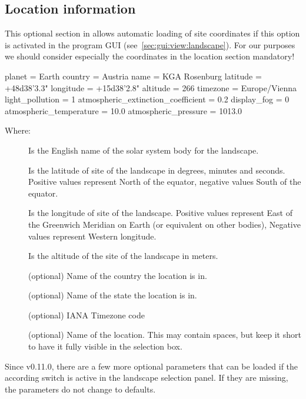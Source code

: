 \subsection{Location information}
\label{sec:landscapes:location}

This optional section in  allows automatic loading
of site coordinates if this option is activated in the program
GUI (see~\ref{sec:gui:view:landscape}). For our purposes we should consider especially the coordinates in
the location section mandatory!

\begin{configfile}
[location]
planet = Earth
country = Austria
name = KGA Rosenburg
latitude = +48d38'3.3"
longitude = +15d38'2.8"
altitude = 266
timezone = Europe/Vienna
light_pollution = 1
atmospheric_extinction_coefficient = 0.2
display_fog = 0
atmospheric_temperature = 10.0
atmospheric_pressure = 1013.0
\end{configfile}
%
Where:
\begin{description}
\item[] Is the English name of the solar system body for
  the landscape.
\item[] Is the latitude of site of the landscape in
  degrees, minutes and seconds. Positive values represent North of the
  equator, negative values South of the equator.
\item[] Is the longitude of site of the
  landscape. Positive values represent East of the Greenwich Meridian
  on Earth (or equivalent on other bodies), Negative values represent
  Western longitude.
\item[] Is the altitude of the site of the landscape in meters.
\item[] (optional) Name of the country the location is in.
\item[] (optional) Name of the state the location is in.
\item[] (optional) IANA Timezone code 
\item[] (optional) Name of the location. This may contain
  spaces, but keep it short to have it fully visible in the
  selection box.
\end{description}
%
Since v0.11.0, there are a few more optional parameters that can be
loaded if the according switch is active in the landscape selection
panel. If they are missing, the parameters do not change to defaults.


